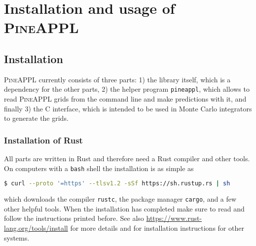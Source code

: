 \section{Installation and usage of \texorpdfstring{\textsc{PineAPPL}}{PineAPPL}}
\label{app:pineappl}

%

\subsection{Installation}
\label{app:installation}

\textsc{PineAPPL} currently consists of three parts: 1) the library itself, which is a dependency for the other parts, 2) the helper program \texttt{pineappl}, which allows to read \textsc{PineAPPL} grids from the command line and make predictions with it, and finally 3) the C interface, which is intended to be used in Monte Carlo integrators to generate the grids.

\subsubsection*{Installation of Rust}


All parts are written in Rust and therefore need a Rust compiler and other tools.
On computers with a \texttt{bash} shell the installation is as simple as
\begin{lstlisting}[language=bash]
 $ curl --proto '=https' --tlsv1.2 -sSf https://sh.rustup.rs | sh
\end{lstlisting}
which downloads the compiler \texttt{rustc}, the package manager \texttt{cargo}, and a few other helpful tools.
When the installation has completed make sure to read and follow the instructions printed before.
See also \url{https://www.rust-lang.org/tools/install} for more details and for installation instructions for other systems.

